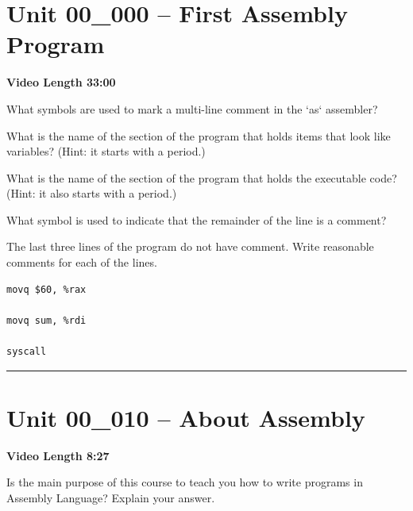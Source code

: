 \documentclass[letterpaper,12pt]{exam}
\newcommand{\unit}{Unit 00}
\begin{document}
\section*{\unit\_000 -- First Assembly Program} 
\par{\selectfont\textbf{Video Length 33:00}}
\begin{questions}

\begin{samepage}
    \question What symbols are used to mark a multi-line comment in the `as` assembler?
    \vspace{5mm}
\end{samepage}

\begin{samepage}
    \question What is the name of the section of the program that holds items that look like variables?  (Hint: it starts with a period.)
    \vspace{5mm}
\end{samepage}

\begin{samepage}
    \question What is the name of the section of the program that holds the executable code? (Hint: it also starts with a period.)
    \vspace{5mm}
\end{samepage}

\begin{samepage}
    \question What symbol is used to indicate that the remainder of the line is a comment?
    \vspace{5mm}

\begin{samepage}
    \question The last three lines of the program do not have comment.  Write reasonable comments for each of the lines.
    \begin{Large}
    \begin{verbatim}
movq $60, %rax

movq sum, %rdi
      
syscall
    \end{verbatim}
    \end{Large}
    \vspace{5mm}
\end{samepage}
\end{samepage}
\hrule %

\section*{\unit\_010 -- About Assembly}
\par{\selectfont\textbf{Video Length 8:27}}
\begin{samepage}
    \question  Is the main purpose of this course to teach you how to write programs in Assembly Language?  Explain your answer.
    \vspace{25mm}
\end{samepage}


\end{questions}
\end{document}
